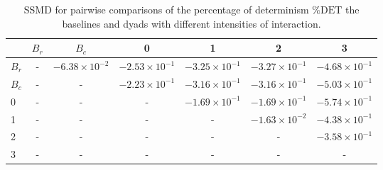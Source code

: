 \begin{table}
\centering
\caption{SSMD for pairwise comparisons of the percentage of determinism $\%\text{DET}$ the baselines and dyads with different intensities of interaction.}
\label{tab:ssmd_det}
\begin{tabular}{lcccccc}
\toprule
 & $B_r$ & $B_c$ & 0 & 1 & 2 & 3 \\
\midrule
$B_r$ & - & $-6.38 \times 10^{-2}$ & $-2.53 \times 10^{-1}$ & $-3.25 \times 10^{-1}$ & $-3.27 \times 10^{-1}$ & $-4.68 \times 10^{-1}$ \\
$B_c$ & - & - & $-2.23 \times 10^{-1}$ & $-3.16 \times 10^{-1}$ & $-3.16 \times 10^{-1}$ & $-5.03 \times 10^{-1}$ \\
0 & - & - & - & $-1.69 \times 10^{-1}$ & $-1.69 \times 10^{-1}$ & $-5.74 \times 10^{-1}$ \\
1 & - & - & - & - & $-1.63 \times 10^{-2}$ & $-4.38 \times 10^{-1}$ \\
2 & - & - & - & - & - & $-3.58 \times 10^{-1}$ \\
3 & - & - & - & - & - & - \\
\bottomrule
\end{tabular}
\end{table}
